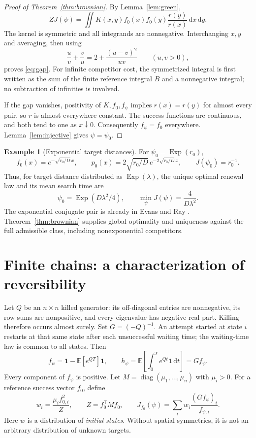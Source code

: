 \documentclass[11pt]{amsart}
\theoremstyle{definition}
\newtheorem{example}[theorem]{Example}
\theoremstyle{remark}
\newcommand{\E}{\mathbb E}
\newcommand{\one}{\mathbf 1}
\newcommand{\Exp}{\operatorname{Exp}}
\newcommand{\diag}{\operatorname{diag}}
\newcommand{\dd}{\,\mathrm d}
\begin{document}
\begin{proof}[Proof of Theorem~\ref{thm:brownian}]
By Lemma~\ref{lem:green},
\[
 ZJ(\psi)=\iint K(x,y)f_0(x)f_0(y)\frac{r(y)}{r(x)}\dd x\dd y.
\]
The kernel is symmetric and all integrands are nonnegative. Interchanging $x,y$ and averaging, then using
\[
 \frac uv+\frac vu=2+\frac{(u-v)^2}{uv}\qquad(u,v>0),
\]
proves \eqref{eq:gap}. For infinite competitor cost, the symmetrized integral is first written as the sum of the finite reference integral $B$ and a nonnegative integral; no subtraction of infinities is involved.

If the gap vanishes, positivity of $K,f_0,f_\psi$ implies $r(x)=r(y)$ for almost every pair, so $r$ is almost everywhere constant. The success functions are continuous, and both tend to one as $x\downarrow0$. Consequently $f_\psi=f_0$ everywhere. Lemma~\ref{lem:injective} gives $\psi=\psi_0$.
\end{proof}

\begin{example}[Exponential target distances]\label{ex:exponential}
For $\psi_0=\Exp(r_0)$,
\[
 f_0(x)=e^{-\sqrt{r_0/D}\,x},\qquad
 p_0(x)=2\sqrt{r_0/D}\,e^{-2\sqrt{r_0/D}\,x},\qquad
 J(\psi_0)=r_0^{-1}.
\]
Thus, for target distance distributed as $\Exp(\lambda)$, the unique optimal renewal law and its mean search time are
\[
 \psi_0=\Exp(D\lambda^2/4),\qquad \min_\psi J(\psi)=\frac4{D\lambda^2}.
\]
The exponential conjugate pair is already in Evans and Ray \cite{EvansRay2025}. Theorem~\ref{thm:brownian} supplies global optimality and uniqueness against the full admissible class, including nonexponential competitors.
\end{example}

\section{Finite chains: a characterization of reversibility}

Let $Q$ be an $n\times n$ killed generator: its off-diagonal entries are nonnegative, its row sums are nonpositive, and every eigenvalue has negative real part. Killing therefore occurs almost surely. Set $G=(-Q)^{-1}$. An attempt started at state $i$ restarts at that same state after each unsuccessful waiting time; the waiting-time law is common to all states. Then
\begin{equation}\label{eq:finitechain}
 f_\psi=\one-\E[e^{QT}]\one,\qquad
 h_\psi=\E\!\left[\int_0^T e^{Qt}\one\dd t\right]=Gf_\psi.
\end{equation}
Every component of $f_\psi$ is positive. Let $M=\diag(\mu_1,\ldots,\mu_n)$ with $\mu_i>0$. For a reference success vector $f_0$, define
\begin{equation}\label{eq:finiteobjective}
 w_i=\frac{\mu_i f_{0,i}^2}{Z},\qquad
 Z=f_0^{\mathsf T}Mf_0,\qquad
 J_{f_0}(\psi)=\sum_i w_i\frac{(Gf_\psi)_i}{f_{\psi,i}}.
\end{equation}
Here $w$ is a distribution of \emph{initial states}. Without spatial symmetries, it is not an arbitrary distribution of unknown targets.
\end{document}

